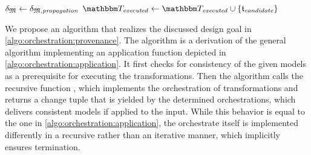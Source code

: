 \begin{algorithm}
\begin{algorithmic}[1]
            \EndIf
            \State $\mathfrak{\delta}_{\mathfrak{M}} \gets \mathfrak{\delta}_{\mathfrak{M},\mathit{propagation}}$
            \State $\provalgexecuted \gets \provalgexecuted \cup \setted{\provalgcandidate}$ \label{algo:orchestration:provenance:line:executed_update}
        \EndFor
        \State {}
    \EndProcedure
    \end{algorithmic}
	
\end{algorithm}


We propose an algorithm that realizes the discussed design goal in \autoref{algo:orchestration:provenance}.
The algorithm is a derivation of the general algorithm implementing an application function depicted in \autoref{algo:orchestration:application}.
It first checks for consistency of the given models as a prerequisite for executing the transformations.
Then the algorithm calls the recursive function , which implements the orchestration of transformations and returns a change tuple that is yielded by the determined orchestrations, which delivers consistent models if applied to the input.
While this behavior is equal to the one in \autoref{algo:orchestration:application}, the orchestrate itself is implemented differently in a recursive rather than an iterative manner, which implicitly ensures termination.

